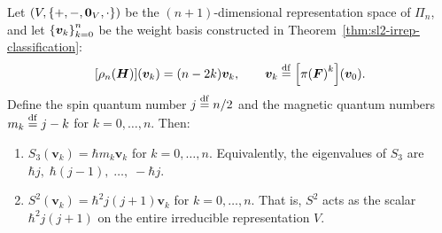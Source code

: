 \documentclass[11pt,reqno]{amsart}
\begin{document}
\begin{Prop}\label{prop:spin-action}
Let $\Br{V,\set{+,-,\bm0_V,\cdot}}$ be the $(n+1)$-dimensional
representation space of $\Pi_n$, and let
$\set{\bm v_k}_{k=0}^n$ be the weight basis constructed in
Theorem~\ref{thm:sl2-irrep-classification}:
\[
\FUNC{\rho_n(\bm H)}{\bm v_k}=(n-2k)\bm v_k,\qquad
\bm v_k\df\FUNC{\pi\Br{\bm F}^k}{\bm{v}_0}.
\]
Define the spin quantum number $j\stackrel{\mathrm{df}}{=} n/2$ and the magnetic quantum
numbers $m_k\stackrel{\mathrm{df}}{=} j-k$ for $k=0,\dots,n$.
Then:
\begin{enumerate}
\item $S_3(\bm v_k)=\hbar m_k\bm v_k$
for $k=0,\dots,n$.
Equivalently, the eigenvalues of $S_3$ are
$\hbar j,\;\hbar(j-1),\;\dots,\;-\hbar j$.
\item $S^2(\bm v_k)=\hbar^2 j(j+1)\bm v_k$
for $k=0,\dots,n$.
That is, $S^2$ acts as the scalar
$\hbar^2 j(j+1)$ on the entire irreducible representation $V$.
\end{enumerate}
\end{Prop}
\end{document}
